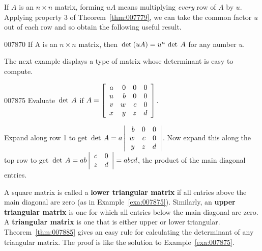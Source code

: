 If $A$ is an $n \times n$ matrix, forming $uA$ means multiplying \textit{every} row of $A$ by $u$. Applying property 3 of Theorem~\ref{thm:007779}, we can take the common factor $u$ out of each row and so obtain the following useful result.


\begin{theorem}{}{007870}
If A is an $ n \times n$ matrix, then $\thinspace\operatorname{det\medspace}(uA) = u^n \thinspace\operatorname{det \medspace} A$ for any number $u$.
\end{theorem}

The next example displays a type of matrix whose determinant is easy to compute.

\begin{example}{}{007875}
Evaluate $\thinspace\operatorname{det \medspace} A$ if 
$A = \left[ \begin{array}{rrrr}
a & 0 & 0 & 0 \\
u & b & 0 & 0 \\
v & w & c & 0 \\
x & y & z & d 
\end{array} \right]$.


\begin{solution}
Expand along row 1 to get $\thinspace\operatorname{det \medspace} A = a \left| \begin{array}{rrr}
b & 0 & 0 \\
w & c & 0 \\
y & z & d 
\end{array} \right|$. Now expand this along the top row to get  $\thinspace\operatorname{det \medspace} A = ab \left| \begin{array}{cc}
c & 0 \\
z & d 
 \end{array} \right| = abcd$, the product of the main diagonal entries.
\end{solution}
\end{example}

A square matrix is called a \textbf{lower triangular matrix} if all entries above the main diagonal are zero (as in Example~\ref{exa:007875}). Similarly, an \textbf{upper triangular matrix} is one for which all entries below the main diagonal are zero. A \textbf{triangular matrix} is one that is either upper or lower triangular. Theorem~\ref{thm:007885} gives an easy rule for calculating the determinant of any triangular matrix. The proof is like the solution to Example~\ref{exa:007875}.


